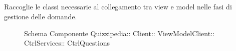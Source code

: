 \subsection{}
Raccoglie le classi necessarie al collegamento tra view e model nelle fasi di gestione delle domande.
\begin{figure}[H]
\centering
\noindent{}
\caption[Schema Componente CtrlQuestions]{Schema Componente Quizzipedia:: Client:: ViewModelClient:: CtrlServices:: CtrlQuestions}
\end{figure}
